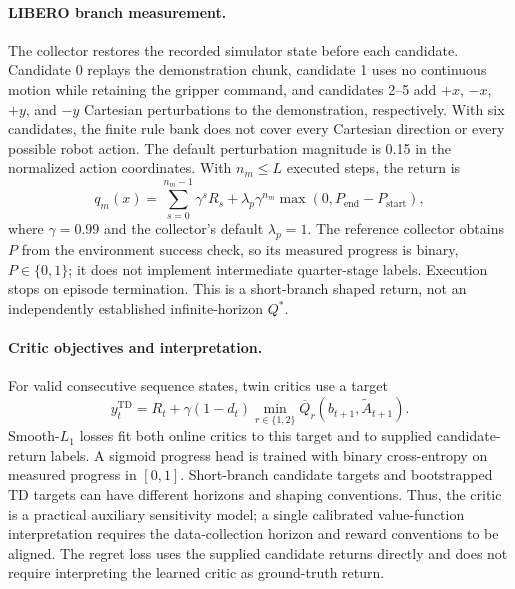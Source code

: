 \documentclass{article}
\begin{document}
\paragraph{LIBERO branch measurement.}
The collector restores the recorded simulator state before each candidate. Candidate 0 replays the demonstration chunk, candidate 1 uses no continuous motion while retaining the gripper command, and candidates 2--5 add $+x$, $-x$, $+y$, and $-y$ Cartesian perturbations to the demonstration, respectively. With six candidates, the finite rule bank does not cover every Cartesian direction or every possible robot action. The default perturbation magnitude is 0.15 in the normalized action coordinates. With $n_m\leq L$ executed steps, the return is
\begin{equation}
q_m(x)=\sum_{s=0}^{n_m-1}\gamma^s R_s
+\lambda_p\gamma^{n_m}\max(0,P_{\mathrm{end}}-P_{\mathrm{start}}),
\end{equation}
where $\gamma=0.99$ and the collector's default $\lambda_p=1$. The reference collector obtains $P$ from the environment success check, so its measured progress is binary, $P\in\{0,1\}$; it does not implement intermediate quarter-stage labels. Execution stops on episode termination. This is a short-branch shaped return, not an independently established infinite-horizon $Q^*$.

\paragraph{Critic objectives and interpretation.}
For valid consecutive sequence states, twin critics use a target
\begin{equation}
y_t^{\mathrm{TD}}=R_t+\gamma(1-d_t)
\min_{r\in\{1,2\}}\overline Q_r(b_{t+1},\widetilde A_{t+1}).
\end{equation}
Smooth-$L_1$ losses fit both online critics to this target and to supplied candidate-return labels. A sigmoid progress head is trained with binary cross-entropy on measured progress in $[0,1]$. Short-branch candidate targets and bootstrapped TD targets can have different horizons and shaping conventions. Thus, the critic is a practical auxiliary sensitivity model; a single calibrated value-function interpretation requires the data-collection horizon and reward conventions to be aligned. The regret loss uses the supplied candidate returns directly and does not require interpreting the learned critic as ground-truth return.
\end{document}
